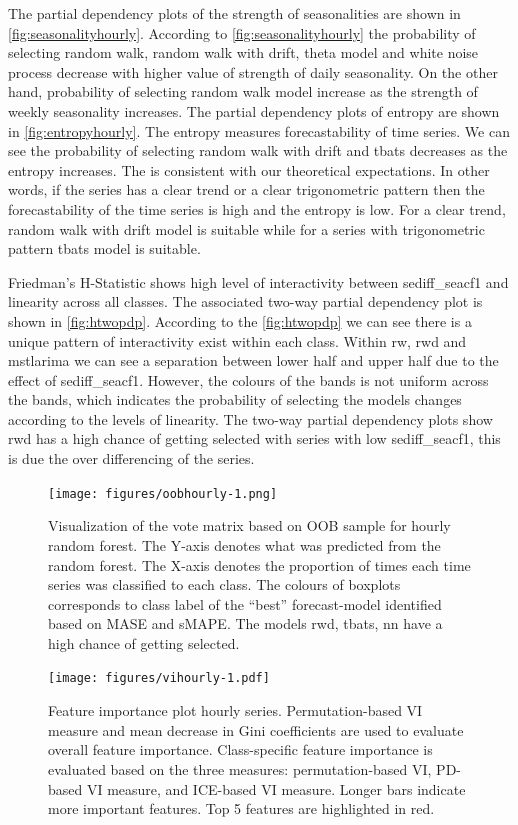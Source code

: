 \documentclass[11pt,a4paper,]{article}
\begin{document}
The partial dependency plots of the strength of seasonalities are shown in \autoref{fig:seasonalityhourly}. According to \autoref{fig:seasonalityhourly} the probability of selecting random walk, random walk with drift, theta model and white noise process decrease with higher value of strength of daily seasonality. On the other hand, probability of selecting random walk model increase as the strength of weekly seasonality increases. The partial dependency plots of entropy are shown in \autoref{fig:entropyhourly}. The entropy measures forecastability of time series. We can see the probability of selecting random walk with drift and tbats decreases as the entropy increases. The is consistent with our theoretical expectations. In other words, if the series has a clear trend or a clear trigonometric pattern then the forecastability of the time series is high and the entropy is low. For a clear trend, random walk with drift model is suitable while for a series with trigonometric pattern tbats model is suitable.

Friedman's H-Statistic shows high level of interactivity between sediff\_seacf1 and linearity across all classes. The associated two-way partial dependency plot is shown in \autoref{fig:htwopdp}. According to the \autoref{fig:htwopdp} we can see there is a unique pattern of interactivity exist within each class. Within rw, rwd and mstlarima we can see a separation between lower half and upper half due to the effect of sediff\_seacf1. However, the colours of the bands is not uniform across the bands, which indicates the probability of selecting the models changes according to the levels of linearity. The two-way partial dependency plots show rwd has a high chance of getting selected with series with low sediff\_seacf1, this is due the over differencing of the series.

\begin{figure}
\centering
\texttt{[image: figures/oobhourly-1.png]}
\caption{\label{fig:oobhourly}Visualization of the vote matrix based on OOB sample for hourly random forest. The Y-axis denotes what was predicted from the random forest. The X-axis denotes the proportion of times each time series was classified to each class. The colours of boxplots corresponds to class label of the ``best'' forecast-model identified based on MASE and sMAPE. The models rwd, tbats, nn have a high chance of getting selected.}
\end{figure}

\begin{figure}
\centering
\texttt{[image: figures/vihourly-1.pdf]}
\caption{\label{fig:vihourly}Feature importance plot hourly series. Permutation-based VI measure and mean decrease in Gini coefficients are used to evaluate overall feature importance. Class-specific feature importance is evaluated based on the three measures: permutation-based VI, PD-based VI measure, and ICE-based VI measure. Longer bars indicate more important features. Top 5 features are highlighted in red.}
\end{figure}
\end{document}
